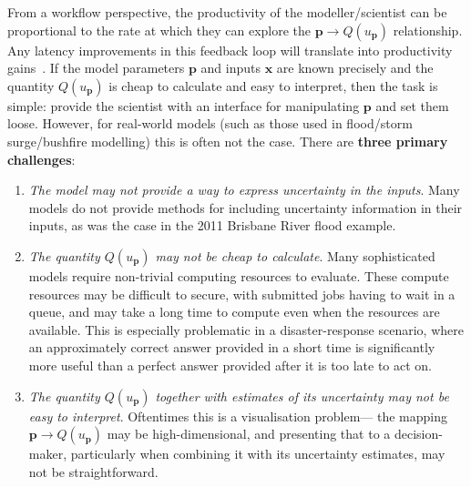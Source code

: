\documentclass[a4paper,fontsize=12pt]{scrartcl}
\begin{document}
From a workflow perspective, the productivity of the modeller/scientist can be 
proportional to the rate at which they can explore the
$\mathbf{p} \rightarrow Q(u_{\mathbf{p}})$ relationship. Any latency
improvements in this feedback loop will translate into productivity
gains~\parencite{liu_effects_2014}.
If the model parameters $\mathbf{p}$ and inputs $\mathbf{x}$ are known
precisely and the quantity $Q(u_{\mathbf{p}})$ is cheap to calculate
and easy to interpret, then the task is simple: provide the scientist
with an interface for manipulating $\mathbf{p}$ and set them loose.
However, for real-world models (such as those used in flood/storm
surge/bushfire modelling) this is often not the case. There are \textbf{three
primary challenges}:
\begin{enumerate}
\item \emph{The model may not provide a way to express uncertainty in
    the inputs}. Many models do not provide methods for including
  uncertainty information in their inputs, as was the case in the 2011
  Brisbane River flood example.
\item \emph{The quantity $Q(u_{\mathbf{p}})$ may not be cheap to
    calculate}. Many
  sophisticated models require non-trivial computing resources to evaluate. These compute resources may be
  difficult to secure, with submitted jobs having to wait in a queue, and may
  take a long time to compute even when the resources are available.
  This is especially problematic in a disaster-response scenario,
  where an approximately correct answer provided in a short time is
  significantly more useful than a perfect answer provided after it is
  too late to act on.
\item \emph{The quantity $Q(u_{\mathbf{p}})$ together with estimates of its uncertainty may not be easy to
    interpret}. Oftentimes this is a visualisation problem---
  the mapping $\mathbf{p} \rightarrow Q(u_{\mathbf{p}})$ may be high-dimensional,
  and presenting that to a decision-maker, particularly when combining it with its uncertainty estimates, may not be straightforward.
\end{enumerate}
\end{document}
